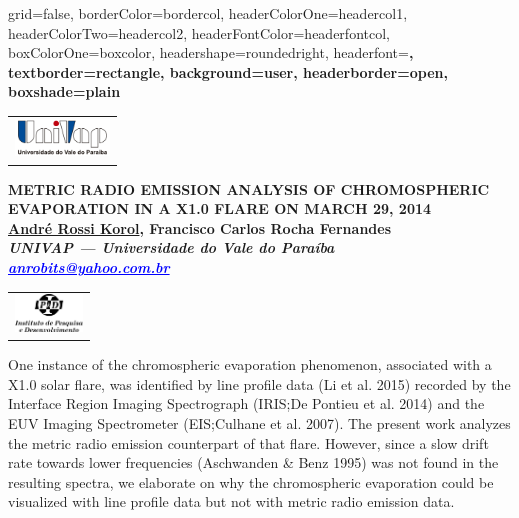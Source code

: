 \documentclass[a0paper,portrait]{baposter}
\begin{document}
\begin{poster}
{grid=false,
borderColor=bordercol, %
headerColorOne=headercol1, %
headerColorTwo=headercol2, %
headerFontColor=headerfontcol, %
boxColorOne=boxcolor, %
headershape=roundedright, %
headerfont=\Large\sf\bf, %
textborder=rectangle,
background=user,
headerborder=open, %
boxshade=plain
}
{\begin{tabular}{c}
        \includegraphics[height=1cm]{UNIVAP-SF.png}\\
\end{tabular}
}
%
%
{\bf  \LARGE {METRIC RADIO EMISSION ANALYSIS OF CHROMOSPHERIC EVAPORATION IN A X1.0 FLARE ON MARCH 29, 2014} \\ %
\vspace{0.2cm}
\footnotesize \underline{André Rossi Korol}, Francisco Carlos Rocha Fernandes\\  %
\footnotesize \it UNIVAP --- Universidade do Vale do Paraíba\\ %
\footnotesize \it \textcolor{blue}{\underline{anrobits@yahoo.com.br}}\/}

{\begin{tabular}{c}
        \includegraphics[height=1cm]{ipd2-sf.png}
\end{tabular}
}

{One instance of the chromospheric evaporation phenomenon, associated with a X1.0
    solar flare, was identified by line profile data (Li et al. 2015) recorded by
    the Interface Region Imaging Spectrograph (IRIS;\@ De Pontieu et al. 2014) and
    the EUV Imaging Spectrometer (EIS;\@ Culhane et al. 2007). The present work analyzes
    the metric radio emission counterpart of that flare. However, since a slow drift
    rate towards lower frequencies (Aschwanden \& Benz 1995) was not found in the
    resulting spectra, we elaborate on why the chromospheric evaporation could be
    visualized with line profile data but not with metric radio emission data.

}
\end{poster}
\end{document}
